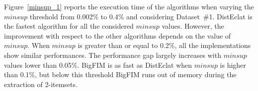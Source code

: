 \documentclass[preprint,review,12pt]{elsarticle}
\begin{document}
Figure~\ref{minsup_1} reports the execution time of the algorithms when varying 
the $minsup$ threshold from 0.002\% to 0.4\% and
considering Dataset~\#1. DistEclat is the fastest algorithm for all the
considered $minsup$ values. However, the improvement with respect to the
other algorithms depends on the value of $minsup$.
When $minsup$ is greater than or equal to 0.2\%, all the implementations show
similar performances.
The performance gap largely increases with $minsup$ values lower than 0.05\%.
BigFIM is as fast as DistEclat when $minsup$ is higher than 0.1\%, but below
this threshold BigFIM runs out of memory during the extraction of 2-itemsets.

\end{document}
